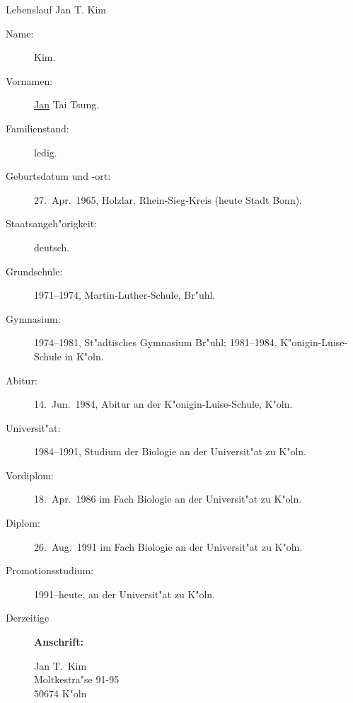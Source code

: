 \documentclass[a4paper]{article}
\begin{document}
\thispagestyle{empty}

\vspace*{4cm}
\centerline{\LARGE Lebenslauf Jan T. Kim}

\begin{description}

\item[Name:] Kim.

\item[Vornamen:] \underline{Jan} Tai Tsung.

\item[Familienstand:] ledig.

\item[Geburtsdatum und -ort:] 27.\ Apr.\ 1965, Holzlar, Rhein-Sieg-Kreis (heute Stadt Bonn).

\item[Staatsangeh"origkeit:] deutsch.

\item[Grundschule:] 1971--1974, Martin-Luther-Schule, Br"uhl.

\item[Gymnasium:] 1974--1981, St"adtisches Gymnasium Br"uhl;
    1981--1984, K"onigin-Luise-Schule in K"oln.

\item[Abitur:] 14.\ Jun.\ 1984, Abitur an der K"onigin-Luise-Schule, K"oln.

\item[Universit"at:] 1984--1991, Studium der Biologie an der Universit"at
    zu K"oln.

\item[Vordiplom:] 18.\ Apr.\ 1986 im Fach Biologie an der Universit"at zu K"oln.

\item[Diplom:] 26.\ Aug.\ 1991 im Fach Biologie an der Universit"at zu K"oln.

\item[Promotionsstudium:] 1991--heute, an der Universit"at zu K"oln.

\item[Derzeitige] {\bf Anschrift:}
{\flushleft
  Jan T.\ Kim \\
  Moltkestra"se 91-95 \\
  50674 K"oln

}
\end{description}
\end{document}
